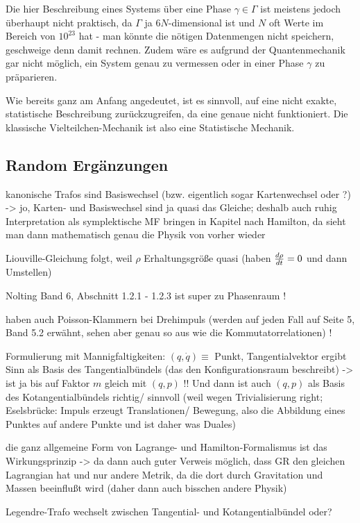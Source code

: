 \documentclass[../class_mech_main.tex]{subfiles}
\begin{document}
Die hier Beschreibung eines Systems über eine Phase $\gamma \in \Gamma$ ist meistens jedoch überhaupt nicht praktisch, da $\Gamma$ ja $6N$-dimensional ist und $N$ oft Werte im Bereich von $10^{23}$ hat - man könnte die nötigen Datenmengen nicht speichern, geschweige denn damit rechnen. Zudem wäre es aufgrund der Quantenmechanik gar nicht möglich, ein System genau zu vermessen oder in einer Phase $\gamma$ zu präparieren.

Wie bereits ganz am Anfang angedeutet, ist es sinnvoll, auf eine nicht exakte, statistische Beschreibung zurückzugreifen, da eine genaue nicht funktioniert. Die klassische Vielteilchen-Mechanik ist also eine Statistische Mechanik.



		\subsection{Random Ergänzungen}

kanonische Trafos sind Basiswechsel (bzw. eigentlich sogar Kartenwechsel oder ?) -> jo, Karten- und Basiswechsel sind ja quasi das Gleiche; deshalb auch ruhig Interpretation als symplektische MF bringen in Kapitel nach Hamilton, da sieht man dann mathematisch genau die Physik von vorher wieder

Liouville-Gleichung folgt, weil $\rho$ Erhaltungsgröße quasi (haben $\dv{\rho}{t} = 0$ und dann Umstellen)

Nolting Band 6, Abschnitt 1.2.1 - 1.2.3 ist super zu Phasenraum !


haben auch Poisson-Klammern bei Drehimpuls (werden auf jeden Fall auf Seite 5, Band 5.2 erwähnt, sehen aber genau so aus wie die Kommutatorrelationen) !



Formulierung mit Mannigfaltigkeiten: $(q,\dot{q}) \equiv$ Punkt, Tangentialvektor ergibt Sinn als Basis des Tangentialbündels (das den Konfigurationsraum beschreibt) -> ist ja bis auf Faktor $m$ gleich mit $(q, p)$ !! Und dann ist auch $(q,p)$ als Basis des Kotangentialbündels richtig/ sinnvoll (weil wegen Trivialisierung right; Eselsbrücke: Impuls erzeugt Translationen/ Bewegung, also die Abbildung eines Punktes auf andere Punkte und ist daher was Duales)



die ganz allgemeine Form von Lagrange- und Hamilton-Formalismus ist das Wirkungsprinzip -> da dann auch guter Verweis möglich, dass GR den gleichen Lagrangian hat und nur andere Metrik, da die dort durch Gravitation und Massen beeinflußt wird (daher dann auch bisschen andere Physik)

Legendre-Trafo wechselt zwischen Tangential- und Kotangentialbündel oder?
\end{document}
